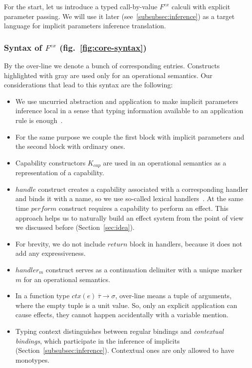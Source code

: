 \documentclass[acmsmall]{acmart}
\newcommand{\ctx}[1]{ctx(#1)~}
\begin{document}
For the start, let us introduce a typed call-by-value $F^{ex}$ calculi with explicit parameter passing.
We will use it later (see\ \ref{subsubsec:inference}) as a target language for implicit parameters inference translation.

\subsubsection{Syntax of $F^{ex}$ (fig.\ \ref{fig:core-syntax})}

By the over-line we denote a bunch of corresponding entries.
Constructs highlighted with gray are used only for an operational semantics.
Our considerations that lead to this syntax are the following:
\begin{itemize}
    \item We use uncurried abstraction and application to make implicit parameters inference local in a sense that typing information available to an application rule is enough~\cite{pierce2000local}.
    \item For the same purpose we couple the first block with implicit parameters and the second block with ordinary ones.
    \item Capability constructors $K_{cap}$ are used in an operational semantics as a representation of a capability. %
    \item $handle$ construct creates a capability associated with a corresponding handler and binds it with a name, so we use so-called lexical handlers~\cite{biernacki2019binders}. %
    At the same time $perform$ construct requires a capability to perform an effect.
    This approach helps us to naturally build an effect system from the point of view we discussed before (Section~\ref{sec:idea}).
    \item For brevity, we do not include $return$ block in handlers, because it does not add any expressiveness.
    \item $handler_m$ construct serves as a continuation delimiter with a unique marker $m$ for an operational semantics.
    \item In a function type $\ctx{e} \overline{\tau} \to \sigma$, over-line means a tuple of arguments, where the empty tuple is a unit value.
    So, only an explicit application can cause effects, they cannot happen accidentally with a variable mention.
    \item Typing context distinguishes between regular bindings and \textit{contextual bindings}, which participate in the inference of implicits (Section\ \ref{subsubsec:inference}).
    Contextual ones are only allowed to have monotypes.
\end{itemize}
\end{document}
